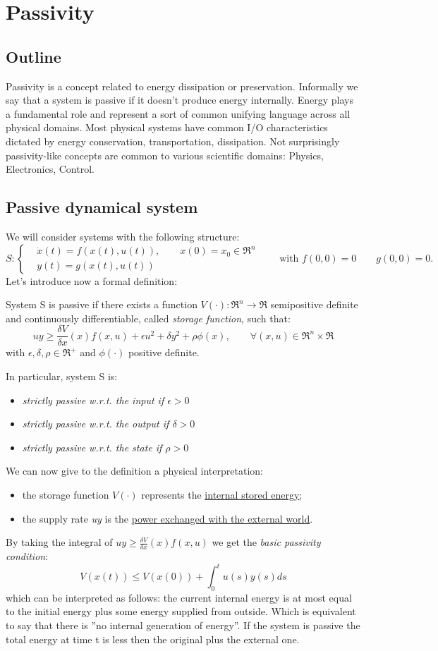 \chapter{Passivity}
\section{Outline}
Passivity is a concept related to energy dissipation or preservation. Informally we say that a system is passive if it doesn't produce energy internally. Energy plays a fundamental role and represent a sort of common unifying language across all physical domains. Most physical systems have common I/O characteristics dictated by energy conservation, transportation, dissipation.
Not surprisingly passivity-like concepts are common to various scientific domains: Physics, Electronics, Control.
\section{Passive dynamical system}
We will consider systems with the following structure:
\[
S:\begin{cases}
	&\dot{x}(t)=f(x(t),u(t)), \qquad x(0)=x_0 \in \Re^n\\
	&y(t)=g(x(t),u(t))
\end{cases}\qquad
\text{with }f(0,0)=0 \qquad g(0,0)=0.
\]
Let's introduce now a formal definition:
\begin{defn}
	System S is passive if there exists a function $V(\cdot)\colon\Re^n\to\Re$ semipositive definite and continuously differentiable, called \emph{storage function}, such that:
	\[
	uy\ge\frac{\delta V}{\delta x}(x)f(x,u)+\epsilon u^2+\delta y^2+\rho\phi(x), \qquad \forall(x,u)\in \Re^n\times\Re
	\]with $\epsilon,\delta,\rho\in\Re^+$ and $\phi(\cdot)$ positive definite.
\end{defn}
In particular, system S is:
\begin{itemize}
	\item \emph{strictly passive w.r.t. the input if $\epsilon >0$}
	\item \emph{strictly passive w.r.t. the output if $\delta >0$}
	\item \emph{strictly passive w.r.t. the state if $\rho >0$} 
\end{itemize}
We can now give to the definition a physical interpretation:
\begin{itemize}
	\item the storage function $V(\cdot)$ represents the \underline{internal stored energy};
	\item the supply rate \emph{uy} is the \underline{power exchanged with the external world}.
\end{itemize}
By taking the integral of $uy\ge\frac{\delta V}{\delta x}(x)f(x,u)$ we get the \emph{basic passivity condition}:
\[
V(x(t))\le V(x(0))+\int_{0}^{t}u(s)y(s)ds
\]which can be interpreted as follows: the current internal energy is at most equal to the initial energy plus some energy supplied from outside. Which is equivalent to say that there is ''no internal generation of energy''. If the system is passive the total energy at time t is less then the original plus the external one.
